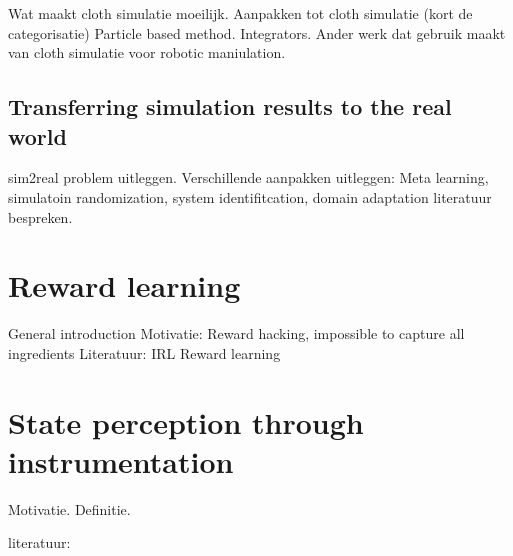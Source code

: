 \documentclass[\home/main.tex]{subfiles}
\begin{document}
Wat maakt cloth simulatie moeilijk. 
Aanpakken tot cloth simulatie (kort de categorisatie)
Particle based method. 
Integrators. 
Ander werk dat gebruik maakt van cloth simulatie voor robotic maniulation.

\subsection{Transferring simulation results to the real world}  \label{sec:lit_sim2real}
sim2real problem uitleggen.
Verschillende aanpakken uitleggen: Meta learning, simulatoin randomization, system identifitcation, domain adaptation
literatuur bespreken. 

\section{Reward learning}  \label{sec:lit_reward_learning}
General introduction 
Motivatie: Reward hacking, impossible to capture all ingredients
Literatuur: 
	IRL 
	Reward learning 

\section{State perception through instrumentation} \label{sec:lit_instrumentation}
Motivatie.
Definitie.

literatuur:
\end{document}
